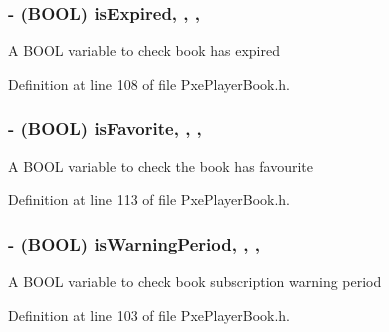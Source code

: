 \hypertarget{interface_pxe_player_book_af6b425654a214e8d5cdc4bd3be2a4203}{
\subsubsection[{is\-Expired}]{\setlength{\rightskip}{0pt plus 5cm}-\/ (B\-O\-O\-L) is\-Expired\hspace{0.3cm}{\ttfamily [read]}, {\ttfamily [write]}, {\ttfamily [nonatomic]}, {\ttfamily [assign]}}}\label{interface_pxe_player_book_af6b425654a214e8d5cdc4bd3be2a4203}
A B\-O\-O\-L variable to check book has expired 

Definition at line 108 of file Pxe\-Player\-Book.\-h.

\hypertarget{interface_pxe_player_book_a9e8503084ff1fe4c3f501be74cce61a5}{
\subsubsection[{is\-Favorite}]{\setlength{\rightskip}{0pt plus 5cm}-\/ (B\-O\-O\-L) is\-Favorite\hspace{0.3cm}{\ttfamily [read]}, {\ttfamily [write]}, {\ttfamily [nonatomic]}, {\ttfamily [assign]}}}\label{interface_pxe_player_book_a9e8503084ff1fe4c3f501be74cce61a5}
A B\-O\-O\-L variable to check the book has favourite 

Definition at line 113 of file Pxe\-Player\-Book.\-h.

\hypertarget{interface_pxe_player_book_a540dc3b69e8d585b9fdb4c344609d9c7}{
\subsubsection[{is\-Warning\-Period}]{\setlength{\rightskip}{0pt plus 5cm}-\/ (B\-O\-O\-L) is\-Warning\-Period\hspace{0.3cm}{\ttfamily [read]}, {\ttfamily [write]}, {\ttfamily [nonatomic]}, {\ttfamily [assign]}}}\label{interface_pxe_player_book_a540dc3b69e8d585b9fdb4c344609d9c7}
A B\-O\-O\-L variable to check book subscription warning period 

Definition at line 103 of file Pxe\-Player\-Book.\-h.

